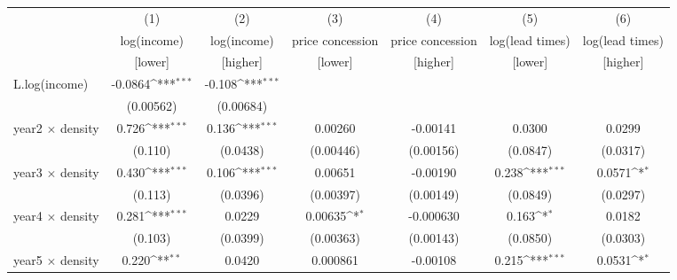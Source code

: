 {
\def\sym#1{\ifmmode^{#1}\else\(^{#1}\)\fi}
\begin{adjustbox}{max width=\textwidth}
\begin{tabular}{l*{6}{c}}
\toprule
            &\multicolumn{1}{c}{(1)}&\multicolumn{1}{c}{(2)}&\multicolumn{1}{c}{(3)}&\multicolumn{1}{c}{(4)}&\multicolumn{1}{c}{(5)}&\multicolumn{1}{c}{(6)}\\
            &\multicolumn{1}{c}{log(income)}&\multicolumn{1}{c}{log(income)}&\multicolumn{1}{c}{price concession}&\multicolumn{1}{c}{price concession}&\multicolumn{1}{c}{log(lead times)}&\multicolumn{1}{c}{log(lead times)}\\
            &\multicolumn{1}{c}{[lower]}&\multicolumn{1}{c}{[higher]}&\multicolumn{1}{c}{[lower]}&\multicolumn{1}{c}{[higher]}&\multicolumn{1}{c}{[lower]}&\multicolumn{1}{c}{[higher]}\\
\midrule
L.log(income) &     -0.0864\sym{***}&      -0.108\sym{***}&                     &                     &                     &                     \\
            &   (0.00562)         &   (0.00684)         &                     &                     &                     &                     \\
\addlinespace
year2 $\times$ density&       0.726\sym{***}&       0.136\sym{***}&     0.00260         &    -0.00141         &      0.0300         &      0.0299         \\
            &     (0.110)         &    (0.0438)         &   (0.00446)         &   (0.00156)         &    (0.0847)         &    (0.0317)         \\
\addlinespace
year3 $\times$ density&       0.430\sym{***}&       0.106\sym{***}&     0.00651         &    -0.00190         &       0.238\sym{***}&      0.0571\sym{*}  \\
            &     (0.113)         &    (0.0396)         &   (0.00397)         &   (0.00149)         &    (0.0849)         &    (0.0297)         \\
\addlinespace
year4 $\times$ density&       0.281\sym{***}&      0.0229         &     0.00635\sym{*}  &   -0.000630         &       0.163\sym{*}  &      0.0182         \\
            &     (0.103)         &    (0.0399)         &   (0.00363)         &   (0.00143)         &    (0.0850)         &    (0.0303)         \\
\addlinespace
year5 $\times$ density&       0.220\sym{**} &      0.0420         &    0.000861         &    -0.00108         &       0.215\sym{***}&      0.0531\sym{*}  \\

\end{tabular}
\end{adjustbox}}
